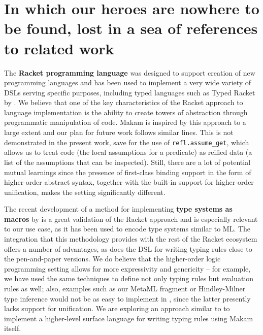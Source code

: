 \section{In which our heroes are nowhere to be found, lost in a sea of
references to related
work}\label{in-which-our-heroes-are-nowhere-to-be-found-lost-in-a-sea-of-references-to-related-work}

\identNormal

The \textbf{Racket programming language} was designed to support
creation of new programming languages \citep{racket-manifesto} and has
been used to implement a very wide variety of DSLs serving specific
purposes, including typed languages such as Typed Racket by
\citet{typed-racket-main-reference}. We believe that one of the key
characteristics of the Racket approach to language implementation is the
ability to create towers of abstraction through programmatic
manipulation of code. Makam is inspired by this approach to a large
extent and our plan for future work follows similar lines. This is not
demonstrated in the present work, save for the use of
\texttt{refl.assume\_get}, which allows us to treat code (the local
assumptions for a predicate) as reified data (a list of the assumptions
that can be inspected). Still, there are a lot of potential mutual
learnings since the presence of first-class binding support in the form
of higher-order abstract syntax, together with the built-in support for
higher-order unification, makes the \lamprolog
setting significantly different.

The recent development of a method for implementing \textbf{type systems
as macros} by \citet{racket-type-systems-as-macros} is a great
validation of the Racket approach and is especially relevant to our use
case, as it has been used to encode type systems similar to ML. The
integration that this methodology provides with the rest of the Racket
ecosystem offers a number of advantages, as does the
 DSL for writing typing rules close to the
pen-and-paper versions. We do believe that the higher-order logic
programming setting allows for more expressivity and genericity -- for
example, we have used the same techniques to define not only typing
rules but evaluation rules as well; also, examples such as our MetaML
fragment or Hindley-Milner type inference would not be as easy to
implement in , since the latter presently lacks
support for unification. We are exploring an approach similar to
 to implement a higher-level surface language for
writing typing rules using Makam itself.

